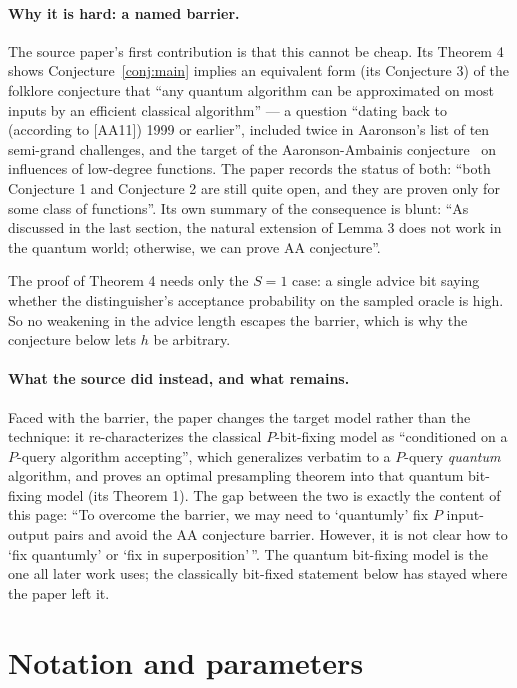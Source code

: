 \documentclass{aicr-conjecture}
\begin{document}
\paragraph{Why it is hard: a named barrier.}
The source paper's first contribution is that this cannot be cheap. Its
Theorem 4 shows Conjecture~\ref{conj:main} implies an equivalent form
(its Conjecture 3) of the folklore conjecture that ``any quantum
algorithm can be approximated on most inputs by an efficient classical
algorithm'' --- a question ``dating back to (according to
[AA11]) 1999 or earlier'', included twice in Aaronson's list of ten
semi-grand challenges, and the target of the Aaronson-Ambainis
conjecture~\cite{AA11} on influences of low-degree functions. The paper
records the status of both: ``both Conjecture 1 and Conjecture 2 are
still quite open, and they are proven only for some class of
functions''. Its own summary of the consequence is blunt: ``As
discussed in the last section, the natural extension of Lemma 3 does not
work in the quantum world; otherwise, we can prove AA conjecture''.

The proof of Theorem 4 needs only the $S = 1$ case: a single advice bit
saying whether the distinguisher's acceptance probability on the sampled
oracle is high. So no weakening in the advice length escapes the
barrier, which is why the conjecture below lets $h$ be arbitrary.

\paragraph{What the source did instead, and what remains.}
Faced with the barrier, the paper changes the target model rather than
the technique: it re-characterizes the classical $P$-bit-fixing model as
``conditioned on a $P$-query algorithm accepting'', which generalizes
verbatim to a $P$-query \emph{quantum} algorithm, and proves an optimal
presampling theorem into that quantum bit-fixing model (its Theorem 1).
The gap between the two is exactly the content of this page: ``To
overcome the barrier, we may need to `quantumly' fix $P$ input-output
pairs and avoid the AA conjecture barrier. However, it is not clear how
to `fix quantumly' or `fix in superposition'\,''. The quantum bit-fixing
model is the one all later work uses; the classically bit-fixed
statement below has stayed where the paper left it.

\section{Notation and parameters}\label{sec:notation}
\end{document}
